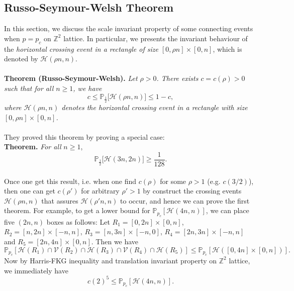 \documentclass[12pt]{article}
\theoremstyle{plane}
\theoremstyle{definition}
\begin{document}
\subsection{Russo-Seymour-Welsh Theorem}
In this section, we discuss the scale invariant property of some connecting events when $p=p_c$ on $\mathbb{Z}^2$ lattice. In particular, we presents the invariant behaviour of the \textit{horizontal crossing event in a rectangle of size $[0,\rho n]\times[0,n]$}, which is denoted by $\mathcal{H}(\rho n, n)$.\\ \\
\textbf{Theorem (Russo-Seymour-Welsh).}
\textit{Let $\rho>0$. There exists $c=c(\rho)>0$ such that for all $n\geq 1$, we have}
\begin{equation*}
c\leq\mathbb{P}_{\frac{1}{2}}\big[\mathcal{H}(\rho n, n)\big]\leq 1-c,
\end{equation*}
\textit{where $\mathcal{H}(\rho n, n)$ denotes the horizontal crossing event in a rectangle with size $[0,\rho n]\times [0,n]$.}\\ \\
They proved this theorem by proving a special case:\\
\textbf{Theorem.} \textit{For all }$n\geq 1$,
\begin{equation*}
\mathbb{P}_{\frac{1}{2}}\big[\mathcal{H}(3n,2n)\big]\geq\frac{1}{128}.
\end{equation*}\\
Once one get this result, i.e. when one find $c(\rho)$ for some $\rho>1$ (e.g. $c(3/2)$), then one can get $c(\rho')$ for arbitrary $\rho'>1$ by construct the crossing events $\mathcal{H}(\rho n,n)$ that assures $\mathcal{H}(\rho'n, n)$ to occur, and hence we can prove the first theorem. For example, to get a lower bound for $\mathbb{P}_{p_c}[\mathcal{H}(4n,n)]$, we can place five $(2n,n)$ boxes as follows: Let $R_1=[0,2n]\times[0,n]$, $R_2=[n,2n]\times[-n,n]$, $R_3=[n,3n]\times[-n,0]$, $R_4=[2n,3n]\times[-n,n]$ and $R_5=[2n,4n]\times[0,n]$. Then we have
\begin{equation*}
\mathbb{P}_{p_c}[\mathcal{H}(R_1)\cap\mathcal{V}(R_2)\cap\mathcal{H}(R_3)\cap\mathcal{V}(R_4)\cap\mathcal{H}(R_5)]\leq\mathbb{P}_{p_c}[\mathcal{H}([0,4n]\times[0,n])].
\end{equation*}
Now by Harris-FKG inequality and translation invariant property on $\mathbb{Z}^2$ lattice, we immediately have
\begin{equation*}
c(2)^5\leq \mathbb{P}_{p_c}[\mathcal{H}(4n,n)].
\end{equation*}
\end{document}
